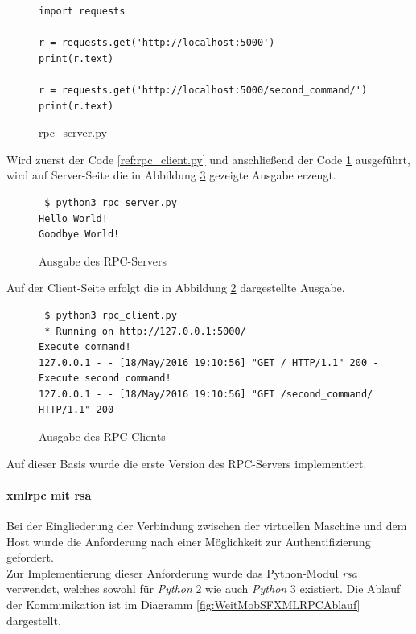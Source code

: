 \begin{figure}
\begin{lstlisting}
import requests

r = requests.get('http://localhost:5000')
print(r.text)

r = requests.get('http://localhost:5000/second_command/')
print(r.text)
\end{lstlisting}
\caption{rpc\_server.py}
\label{ref:rpc_server.py}
\end{figure}

Wird zuerst der Code \ref{ref:rpc_client.py} und anschließend der Code \ref{ref:rpc_server.py} ausgeführt, wird auf Server-Seite die in Abbildung \ref{lst:WeitMobSFRPCAusgClient} gezeigte Ausgabe erzeugt.\\
\begin{figure}[h]
\begin{lstlisting}
 $ python3 rpc_server.py
Hello World!
Goodbye World!
\end{lstlisting}
\caption{Ausgabe des RPC-Servers}
\label{lst:WeitMobSFRPCAusgServ}
\end{figure}

Auf der Client-Seite erfolgt die in Abbildung \ref{lst:WeitMobSFRPCAusgServ} dargestellte Ausgabe.
\begin{figure}[h]
\begin{lstlisting}
 $ python3 rpc_client.py
 * Running on http://127.0.0.1:5000/
Execute command!
127.0.0.1 - - [18/May/2016 19:10:56] "GET / HTTP/1.1" 200 -
Execute second command!
127.0.0.1 - - [18/May/2016 19:10:56] "GET /second_command/ HTTP/1.1" 200 -
\end{lstlisting}
\caption{Ausgabe des RPC-Clients}
\label{lst:WeitMobSFRPCAusgClient}
\end{figure}

Auf dieser Basis wurde die erste Version des RPC-Servers implementiert.

\newpage
\paragraph{xmlrpc mit rsa}
Bei der Eingliederung der Verbindung zwischen der virtuellen Maschine und dem Host wurde die Anforderung nach einer Möglichkeit zur Authentifizierung gefordert.\\

Zur Implementierung dieser Anforderung wurde das Python-Modul \textit{rsa} verwendet, welches sowohl für \textit{Python} 2 wie auch \textit{Python} 3 existiert. Die Ablauf der Kommunikation ist im Diagramm \ref{fig:WeitMobSFXMLRPCAblauf} dargestellt.\\

